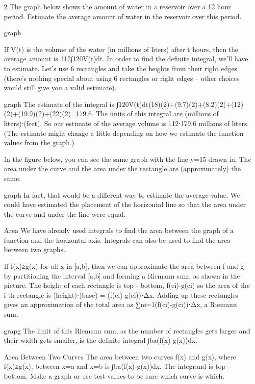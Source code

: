 \begin{example}  2
The graph below shows the amount of water in a reservoir over a 12 hour period. Estimate the average amount of water in the reservoir over this period.

graph
\begin{solution}
If V(t) is the volume of the water (in millions of liters) after t hours, then the average amount is 112∫120V(t)dt. In order to find the definite integral, we'll have to estimate. Let's use 6 rectangles and take the heights from their right edges (there's nothing special about using 6 rectangles or right edges – other choices would still give you a valid estimate).

graph
The estimate of the integral is
∫120V(t)dt\approx   (18)(2)+(9.7)(2)+(8.2)(2)+(12)(2)+(19.9)(2)+(22)(2)=179.6.
The units of this integral are (millions of liters)⋅(feet). So our estimate of the average volume is 112⋅179.6 millions of liters. (The estimate might change a little depending on how we estimate the function values from the graph.)

In the figure below, you can see the same graph with the line y=15 drawn in. The area under the curve and the area under the rectangle are (approximately) the same.

graph
In fact, that would be a different way to estimate the average value. We could have estimated the placement of the horizontal line so that the area under the curve and under the line were equal.
\end{solution}\end{example}

Area
We have already used integrals to find the area between the graph of a function and the horizontal axis. Integrals can also be used to find the area between two graphs.

If f(x)≥g(x) for all x in [a,b], then we can approximate the area between f and g by partitioning the interval [a,b] and forming a Riemann sum, as shown in the picture. The height of each rectangle is top - bottom, f(ci)-g(ci) so the area of the i-th rectangle is (height)⋅(base) = (f(ci)-g(ci))⋅Δx. Adding up these rectangles gives an approximation of the total area as ∑ni=1(f(ci)-g(ci))⋅Δx, a Riemann sum.

grapg
The limit of this Riemann sum, as the number of rectangles gets larger and their width gets smaller, is the definite integral ∫ba(f(x)-g(x))dx.

Area Between Two Curves
The area between two curves f(x) and g(x), where f(x)≥g(x), between x=a and x=b is
∫ba(f(x)-g(x))dx.
The integrand is top - bottom. Make a graph or use test values to be sure which curve is which.

